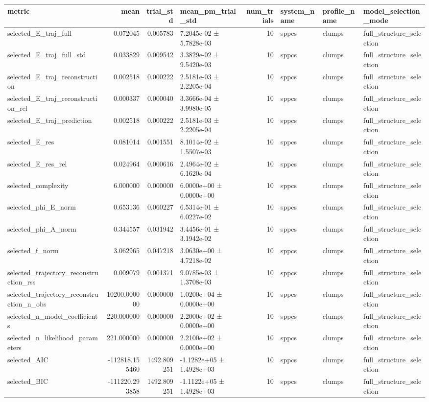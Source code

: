 \begin{tabular}{lrrlrlll}
\toprule
metric & mean & trial_std & mean_pm_trial_std & num_trials & system_name & profile_name & model_selection_mode \\
\midrule
selected_E_traj_full & 0.072045 & 0.005783 & 7.2045e-02 ± 5.7828e-03 & 10 & sppcs & clumps & full_structure_selection \\
selected_E_traj_full_std & 0.033829 & 0.009542 & 3.3829e-02 ± 9.5420e-03 & 10 & sppcs & clumps & full_structure_selection \\
selected_E_traj_reconstruction & 0.002518 & 0.000222 & 2.5181e-03 ± 2.2205e-04 & 10 & sppcs & clumps & full_structure_selection \\
selected_E_traj_reconstruction_rel & 0.000337 & 0.000040 & 3.3666e-04 ± 3.9980e-05 & 10 & sppcs & clumps & full_structure_selection \\
selected_E_traj_prediction & 0.002518 & 0.000222 & 2.5181e-03 ± 2.2205e-04 & 10 & sppcs & clumps & full_structure_selection \\
selected_E_res & 0.081014 & 0.001551 & 8.1014e-02 ± 1.5507e-03 & 10 & sppcs & clumps & full_structure_selection \\
selected_E_res_rel & 0.024964 & 0.000616 & 2.4964e-02 ± 6.1620e-04 & 10 & sppcs & clumps & full_structure_selection \\
selected_complexity & 6.000000 & 0.000000 & 6.0000e+00 ± 0.0000e+00 & 10 & sppcs & clumps & full_structure_selection \\
selected_phi_E_norm & 0.653136 & 0.060227 & 6.5314e-01 ± 6.0227e-02 & 10 & sppcs & clumps & full_structure_selection \\
selected_phi_A_norm & 0.344557 & 0.031942 & 3.4456e-01 ± 3.1942e-02 & 10 & sppcs & clumps & full_structure_selection \\
selected_f_norm & 3.062965 & 0.047218 & 3.0630e+00 ± 4.7218e-02 & 10 & sppcs & clumps & full_structure_selection \\
selected_trajectory_reconstruction_rss & 0.009079 & 0.001371 & 9.0785e-03 ± 1.3708e-03 & 10 & sppcs & clumps & full_structure_selection \\
selected_trajectory_reconstruction_n_obs & 10200.000000 & 0.000000 & 1.0200e+04 ± 0.0000e+00 & 10 & sppcs & clumps & full_structure_selection \\
selected_n_model_coefficients & 220.000000 & 0.000000 & 2.2000e+02 ± 0.0000e+00 & 10 & sppcs & clumps & full_structure_selection \\
selected_n_likelihood_parameters & 221.000000 & 0.000000 & 2.2100e+02 ± 0.0000e+00 & 10 & sppcs & clumps & full_structure_selection \\
selected_AIC & -112818.155460 & 1492.809251 & -1.1282e+05 ± 1.4928e+03 & 10 & sppcs & clumps & full_structure_selection \\
selected_BIC & -111220.293858 & 1492.809251 & -1.1122e+05 ± 1.4928e+03 & 10 & sppcs & clumps & full_structure_selection \\
\bottomrule
\end{tabular}
